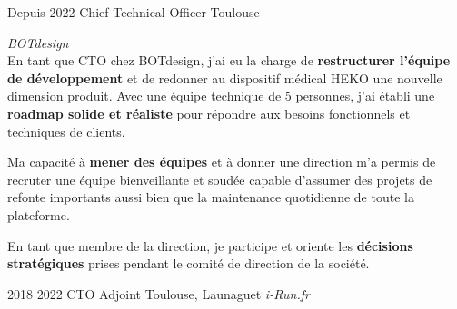 \documentclass{friggeri-cv} 	%
\begin{document}
\begin{entrylist}
\entry
{Depuis 2022}
{Chief Technical Officer}
{Toulouse}
{\vspace{-0.2cm}\emph{BOTdesign} \\

En tant que CTO chez BOTdesign, j’ai eu la charge de \textbf{restructurer l’équipe de développement} et de redonner au dispositif médical HEKO une nouvelle
dimension produit. Avec une équipe technique de 5 personnes, j'ai établi une \textbf{roadmap solide et réaliste} pour répondre aux besoins fonctionnels et techniques
de clients.

Ma capacité à \textbf{mener des équipes} et à donner une direction m’a permis de recruter une équipe bienveillante et soudée capable d’assumer des projets de
refonte importants aussi bien que la maintenance quotidienne de toute la plateforme.

En tant que membre de la direction, je participe et oriente les \textbf{décisions stratégiques} prises pendant le comité de direction de la société.
\\
}

\entry
{2018  2022}
{CTO Adjoint}
{Toulouse, Launaguet}
{\vspace{-0.2cm}\emph{i-Run.fr} \\

}
\end{entrylist}
\end{document}
